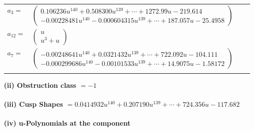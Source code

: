 \documentclass[1p]{elsarticle_modified}
\theoremstyle{definition}
\begin{document}
\begin{tabular}{m{7pt} m{180pt} m{7pt} m{180pt} }
\flushright $a_{3}=$&$\begin{pmatrix}0.106236 u^{140}+0.508300 u^{139}+\cdots+1272.99 u-219.614\\-0.00228481 u^{140}-0.000604315 u^{139}+\cdots+187.057 u-25.4958\end{pmatrix}$ \\
\flushright $a_{12}=$&$\begin{pmatrix}u\\u^3+u\end{pmatrix}$ \\
\flushright $a_{7}=$&$\begin{pmatrix}-0.00248641 u^{140}+0.0321432 u^{139}+\cdots+722.092 u-104.111\\-0.000299686 u^{140}-0.00101533 u^{139}+\cdots+14.9075 u-1.58172\end{pmatrix}$\\&\end{tabular}
\flushleft \textbf{(ii) Obstruction class $= -1$}\\~\\
\flushleft \textbf{(iii) Cusp Shapes $= 0.0414932 u^{140}+0.207190 u^{139}+\cdots+724.356 u-117.682$}\\~\\
\newpage\renewcommand{\arraystretch}{1}
\flushleft \textbf{(iv) u-Polynomials at the component}\newline \\
\end{document}

